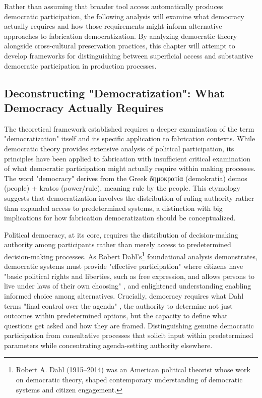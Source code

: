 \vspace{0.5cm} 

Rather than assuming that broader tool access automatically produces democratic participation, the following analysis will examine what democracy actually requires and how those requirements might inform alternative approaches to fabrication democratization. By analyzing democratic theory alongside cross-cultural preservation practices, this chapter will attempt to develop frameworks for distinguishing between superficial access and substantive democratic participation in production processes.

\subsection{Deconstructing "Democratization": What Democracy Actually Requires}

The theoretical framework established requires a deeper examination of the term "democratization" itself and its specific application to fabrication contexts. While democratic theory provides extensive analysis of political participation, its principles have been applied to fabrication with insufficient critical examination of what democratic participation might actually require within making processes. The word "democracy" derives from the Greek {\greekfont δημοκρατία} (demokratia) demos (people) + kratos (power/rule), meaning rule by the people. This etymology suggests that democratization involves the distribution of ruling authority rather than expanded access to predetermined systems, a distinction with big implications for how fabrication democratization should be conceptualized.

\vspace{0.5cm}

Political democracy, at its core, requires the distribution of decision-making authority among participants rather than merely access to predetermined decision-making processes. As Robert Dahl's\footnote{Robert A. Dahl (1915--2014) was an American political theorist whose work on democratic theory, shaped contemporary understanding of democratic systems and citizen engagement.} foundational analysis demonstrates, democratic systems must provide "effective participation" \citep{coglianese1990} where citizens have "basic political rights and liberties, such as free expression, and allows persons to live under laws of their own choosing" \citep{coglianese1990}, and enlightened understanding enabling informed choice among alternatives. Crucially, democracy requires what Dahl terms "final control over the agenda" \citep{mayhew2017}, the authority to determine not just outcomes within predetermined options, but the capacity to define what questions get asked and how they are framed. Distinguishing genuine democratic participation from consultative processes that solicit input within predetermined parameters while concentrating agenda-setting authority elsewhere.

